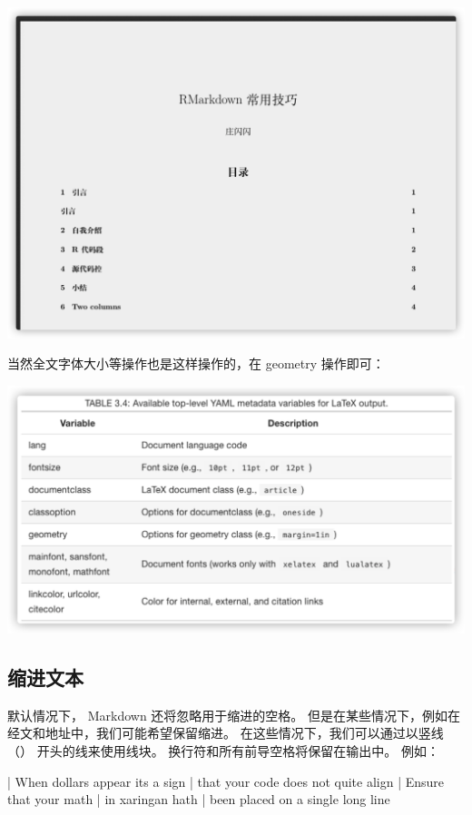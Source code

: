 \documentclass[
]{book}
\newenvironment{Shaded}{\begin{snugshade}}{\end{snugshade}}
\newcommand{\NormalTok}[1]{#1}
\begin{document}
\includegraphics{images/paste-3E59C75E.png}

当然全文字体大小等操作也是这样操作的，在 geometry 操作即可：

\includegraphics{images/paste-9D62CD2E.png}

\hypertarget{ux7f29ux8fdbux6587ux672c}{%
\subsection{缩进文本}\label{ux7f29ux8fdbux6587ux672c}}

默认情况下， Markdown 还将忽略用于缩进的空格。
但是在某些情况下，例如在经文和地址中，我们可能希望保留缩进。
在这些情况下，我们可以通过以竖线 （\textbar） 开头的线来使用线块。
换行符和所有前导空格将保留在输出中。 例如：

\begin{Shaded}
\begin{Highlighting}[]
\NormalTok{| When dollars appear it\textquotesingle{}s a sign}
\NormalTok{|   that your code does not quite align  }
\NormalTok{| Ensure that your math  }
\NormalTok{|   in xaringan hath  }
\NormalTok{|   been placed on a single long line}
\end{Highlighting}
\end{Shaded}
\end{document}
